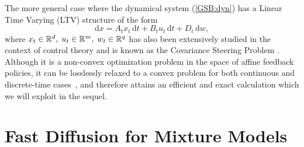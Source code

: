 \documentclass[twoside]{article}
\renewcommand{\eqref}[1]{(\ref{#1})}
\renewcommand{\d}{\mathrm{d}}
\begin{document}
 The more general case where the dynamical system \eqref{GSB:dyn} has a Linear Time Varying (LTV) structure of the form 
\begin{equation}
    \d x = A_t x_t \, \d t + B_t u_t \, \d t + D_t \, \d w,
\end{equation}
where $x_t \in {\mathbb{R}}^d,\; u_t \in {\mathbb{R}}^{m},\; w_t \in {\mathbb{R}}^q$ has also been extensively studied in the context of control theory and is known as the Covariance Steering Problem \citep{chen2015optimal, chen2015optimal2, bakolas2018finite, liu2022optimal}.
Although it is a non-convex optimization problem in the space of affine feedback policies, it can be losslessly relaxed to a convex problem for both continuous and discrete-time cases~\citep{chen2015optimal2, liu2022optimal}, and therefore attains an efficient and exact calculation which we will exploit in the sequel.

\section{Fast Diffusion for Mixture Models}
\end{document}
